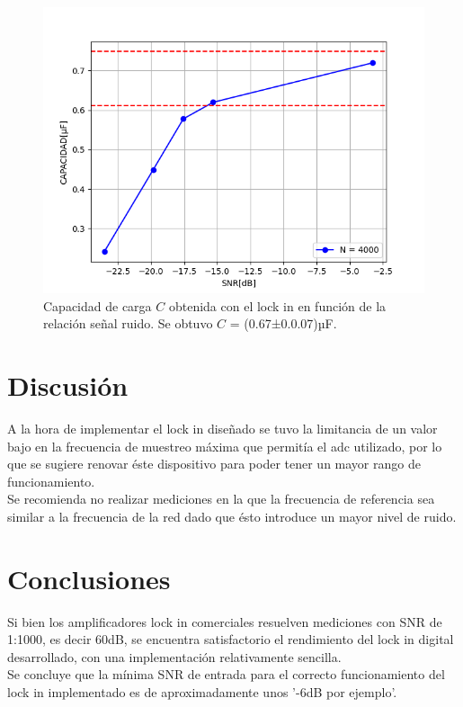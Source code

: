 \documentclass[11pt,a4paper]{extarticle}
\begin{document}
\begin{multicols}{2}
\begin{figure}[H]
	\centering
	\includegraphics[width=\linewidth]{Images/CvsSNR(segunda).png}
	\caption{Capacidad de carga $C$ obtenida con 
	el lock in en función
	de la relación señal ruido. Se obtuvo 
	$C$ = (0.67±0.0.07)µF.}
	\label{fig:CvsSNR}
\end{figure}


\section{Discusión}
A la hora de implementar el lock in diseñado se tuvo 
la limitancia de un valor bajo en la frecuencia de 
muestreo máxima que permitía el adc utilizado, por lo 
que se sugiere renovar éste 
dispositivo para poder tener un mayor 
rango de funcionamiento.\\

Se recomienda no realizar mediciones 
en la que la frecuencia de referencia sea 
similar a la frecuencia de la red dado que 
ésto introduce un mayor nivel de ruido.


\section{Conclusiones}

Si bien los amplificadores lock in comerciales resuelven 
mediciones con SNR de 1:1000, es decir 60dB,
 se encuentra satisfactorio 
el rendimiento del lock in digital desarrollado, con 
una implementación relativamente sencilla.\\

Se concluye que la mínima SNR de entrada para el 
correcto funcionamiento del lock in implementado es de 
aproximadamente unos '-6dB por ejemplo'.


\end{multicols}
\end{document}
